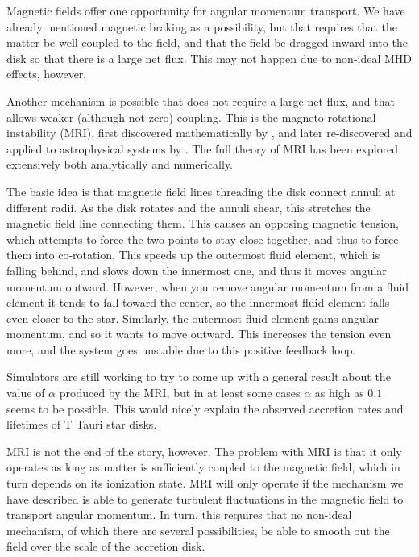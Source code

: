 Magnetic fields offer one opportunity for angular momentum transport. We have already mentioned magnetic braking as a possibility, but that requires that the matter be well-coupled to the field, and that the field be dragged inward into the disk so that there is a large net flux. This may not happen due to non-ideal MHD effects, however.

Another mechanism is possible that does not require a large net flux, and that allows weaker (although not zero) coupling. This is the magneto-rotational instability (MRI), first discovered mathematically by \citet{chandrasekhar61a}, and later re-discovered and applied to astrophysical systems by \citet{balbus91a}. The full theory of MRI has been explored extensively both analytically and numerically.

The basic idea is that magnetic field lines threading the disk connect annuli at different radii. As the disk rotates and the annuli shear, this stretches the magnetic field line connecting them. This causes an opposing magnetic tension, which attempts to force the two points to stay close together, and thus to force them into co-rotation. This speeds up the outermost fluid element, which is falling behind, and slows down the innermost one, and thus it moves angular momentum outward. However, when you remove angular momentum from a fluid element it tends to fall toward the center, so the innermost fluid element falls even closer to the star. Similarly, the outermost fluid element gains angular momentum, and so it wants to move outward. This increases the tension even more, and the system goes unstable due to this positive feedback loop.

Simulators are still working to try to come up with a general result about the value of $\alpha$ produced by the MRI, but in at least some cases $\alpha$ as high as $0.1$ seems to be possible. This would nicely explain the observed accretion rates and lifetimes of T Tauri star disks.

MRI is not the end of the story, however. The problem with MRI is that it only operates as long as matter is sufficiently coupled to the magnetic field, which in turn depends on its ionization state. MRI will only operate if the mechanism we have described is able to generate turbulent fluctuations in the magnetic field to transport angular momentum. In turn, this requires that no non-ideal mechanism, of which there are several possibilities, be able to smooth out the field over the scale of the accretion disk.

